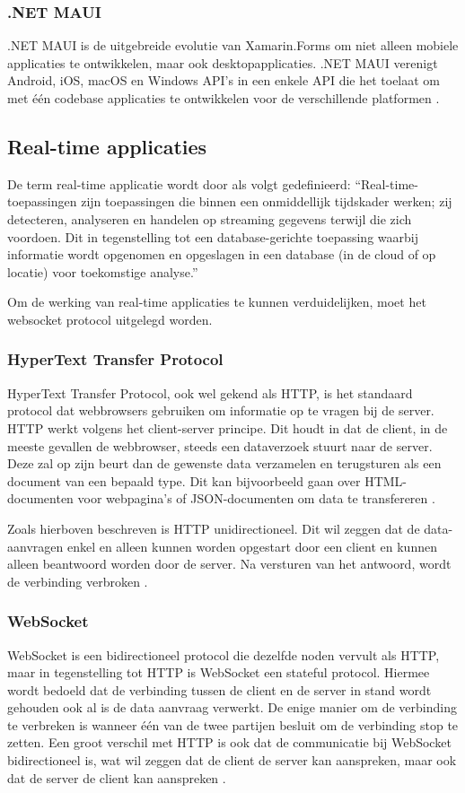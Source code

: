 \subsubsection{.NET MAUI}
.NET MAUI is de uitgebreide evolutie van Xamarin.Forms om niet alleen mobiele applicaties te ontwikkelen, maar ook desktopapplicaties. .NET MAUI verenigt Android, iOS, macOS en Windows API’s in een enkele API  die het toelaat om met één codebase applicaties te ontwikkelen voor de verschillende platformen \autocite{Britch2022}.

\subsection{Real-time applicaties}
De term real-time applicatie wordt door \textcite{Lutkevich2022} als volgt gedefinieerd:
“Real-time-toepassingen zijn toepassingen die binnen een onmiddellijk tijdskader werken; zij detecteren, analyseren en handelen op streaming gegevens terwijl die zich voordoen. Dit in tegenstelling tot een database-gerichte toepassing waarbij informatie wordt opgenomen en opgeslagen in een database (in de cloud of op locatie) voor toekomstige analyse.”

Om de werking van real-time applicaties te kunnen verduidelijken, moet het websocket protocol uitgelegd worden.

\subsubsection{HyperText Transfer Protocol}
HyperText Transfer Protocol, ook wel gekend als HTTP, is het standaard protocol dat webbrowsers gebruiken om informatie op te vragen bij de server. HTTP werkt volgens het client-server principe. Dit houdt in dat de client, in de meeste gevallen de webbrowser, steeds een dataverzoek stuurt naar de server. Deze zal op zijn beurt dan de gewenste data verzamelen en terugsturen als een document van een bepaald type. Dit kan bijvoorbeeld gaan over HTML-documenten voor webpagina’s of JSON-documenten om data te transfereren \autocite{MDN2022}.

Zoals hierboven beschreven is HTTP unidirectioneel. Dit wil zeggen dat de data-aanvragen enkel en alleen kunnen worden opgestart door een client en kunnen alleen beantwoord worden door de server. Na versturen van het antwoord, wordt de verbinding verbroken \autocite{MDN2022}.

\subsubsection{WebSocket}
WebSocket is een bidirectioneel protocol die dezelfde noden vervult als HTTP, maar in tegenstelling tot HTTP is WebSocket een stateful protocol. Hiermee wordt bedoeld dat de verbinding tussen de client en de server in stand wordt gehouden ook al is de data aanvraag verwerkt. De enige manier om de verbinding te verbreken is wanneer één van de twee partijen besluit om de verbinding stop te zetten. Een groot verschil met HTTP is ook dat de communicatie bij WebSocket bidirectioneel is, wat wil zeggen dat de client de server kan aanspreken, maar ook dat de server de client kan aanspreken \autocite{GeeksforGeeks2022}.


